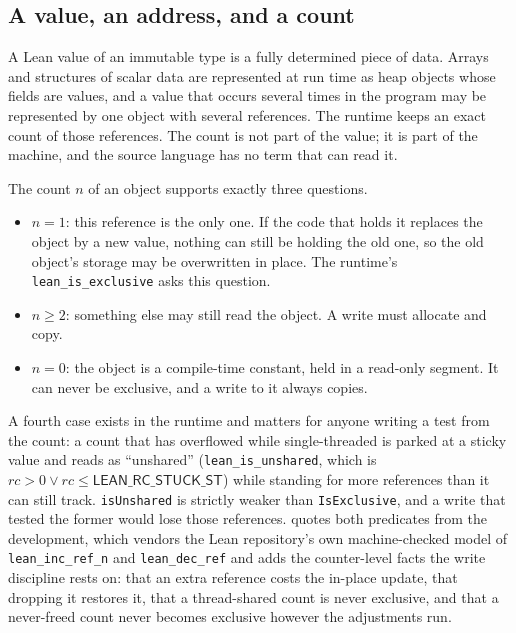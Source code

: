 \documentclass[11pt,a4paper]{article}
\theoremstyle{definition}
\theoremstyle{plain}
\newcommand{\code}[1]{\texttt{#1}}
\begin{document}
\subsection{A value, an address, and a count}

A Lean value of an immutable type is a fully determined piece of data. Arrays
and structures of scalar data are represented at run time as heap objects whose
fields are values, and a value that occurs several times in the program may be
represented by one object with several references. The runtime keeps an exact
count of those references. The count is not part of the value; it is part of the
machine, and the source language has no term that can read it.

The count $n$ of an object supports exactly three questions.

\begin{itemize}[leftmargin=1.4em,itemsep=2pt]
\item $n = 1$: this reference is the only one. If the code that holds it
replaces the object by a new value, nothing can still be holding the old one, so
the old object's storage may be overwritten in place. The runtime's
\code{lean\_is\_exclusive} asks this question.
\item $n \geq 2$: something else may still read the object. A write must
allocate and copy.
\item $n = 0$: the object is a compile-time constant, held in a read-only
segment. It can never be exclusive, and a write to it always copies.
\end{itemize}

A fourth case exists in the runtime and matters for anyone writing a test from
the count: a count that has overflowed while single-threaded is parked at a
sticky value and reads as ``unshared'' (\code{lean\_is\_unshared}, which is
$\mathit{rc} > 0 \lor \mathit{rc} \leq \mathsf{LEAN\_RC\_STUCK\_ST}$) while
standing for more references than it can still track. \code{isUnshared} is
strictly weaker than \code{IsExclusive}, and a write that tested the former
would lose those references.  quotes both predicates from the
development, which vendors the Lean repository's own machine-checked model of
\code{lean\_inc\_ref\_n} and \code{lean\_dec\_ref}
\cite{lean4rcmodel} and adds the counter-level facts the write discipline rests
on: that an extra reference costs the in-place update, that dropping it restores
it, that a thread-shared count is never exclusive, and that a never-freed count
never becomes exclusive however the adjustments run.
\end{document}
